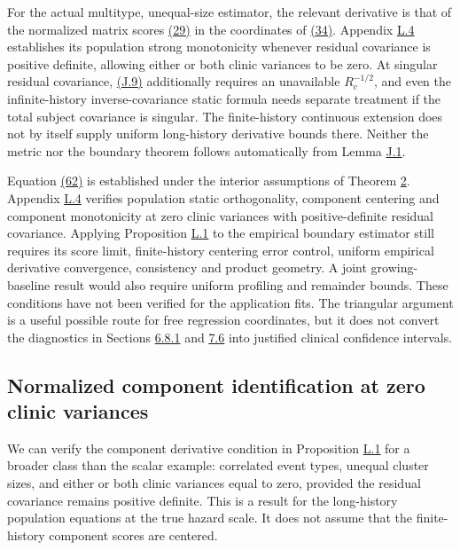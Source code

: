 \documentclass[11pt]{article}
\begin{document}
For the actual multitype, unequal-size estimator, the relevant derivative is that of the normalized matrix scores \hyperref[eq:29]{(29)} in the coordinates of \hyperref[eq:34]{(34)}. Appendix \hyperref[sec:L.4]{L.4} establishes its population strong monotonicity whenever residual covariance is positive definite, allowing either or both clinic variances to be zero. At singular residual covariance, \hyperref[eq:J.9]{(J.9)} additionally requires an unavailable \(R_c^{-1/2}\), and even the infinite-history inverse-covariance static formula needs separate treatment if the total subject covariance is singular. The finite-history continuous extension does not by itself supply uniform long-history derivative bounds there. Neither the metric nor the boundary theorem follows automatically from Lemma \hyperref[res:Lemma-J.1]{J.1}.

Equation \hyperref[eq:62]{(62)} is established under the interior assumptions of Theorem \hyperref[res:Theorem-2]{2}. Appendix \hyperref[sec:L.4]{L.4} verifies population static orthogonality, component centering and component monotonicity at zero clinic variances with positive-definite residual covariance. Applying Proposition \hyperref[res:Proposition-L.1]{L.1} to the empirical boundary estimator still requires its score limit, finite-history centering error control, uniform empirical derivative convergence, consistency and product geometry. A joint growing-baseline result would also require uniform profiling and remainder bounds. These conditions have not been verified for the application fits. The triangular argument is a useful possible route for free regression coordinates, but it does not convert the diagnostics in Sections \hyperref[sec:6.8.1]{6.8.1} and \hyperref[sec:7.6]{7.6} into justified clinical confidence intervals.

\subsection{Normalized component identification at zero clinic variances}\label{sec:L.4}

We can verify the component derivative condition in Proposition \hyperref[res:Proposition-L.1]{L.1} for a broader class than the scalar example: correlated event types, unequal cluster sizes, and either or both clinic variances equal to zero, provided the residual covariance remains positive definite. This is a result for the long-history population equations at the true hazard scale. It does not assume that the finite-history component scores are centered.
\end{document}
